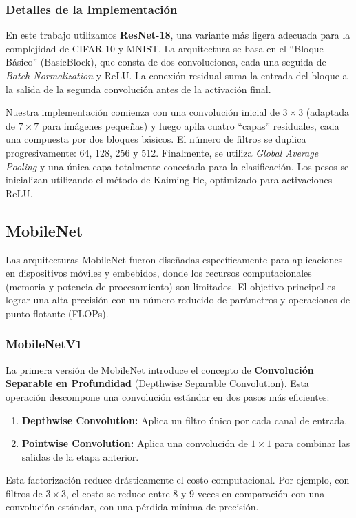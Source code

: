 \documentclass{pas}
\begin{document}
\subsubsection{Detalles de la Implementación}

En este trabajo utilizamos \textbf{ResNet-18}, una variante más ligera adecuada para la complejidad de CIFAR-10 y MNIST. La arquitectura se basa en el ``Bloque Básico'' (BasicBlock), que consta de dos convoluciones, cada una seguida de \textit{Batch Normalization} y ReLU. La conexión residual suma la entrada del bloque a la salida de la segunda convolución antes de la activación final.

Nuestra implementación comienza con una convolución inicial de $3 \times 3$ (adaptada de $7 \times 7$ para imágenes pequeñas) y luego apila cuatro ``capas'' residuales, cada una compuesta por dos bloques básicos. El número de filtros se duplica progresivamente: 64, 128, 256 y 512. Finalmente, se utiliza \textit{Global Average Pooling} y una única capa totalmente conectada para la clasificación. Los pesos se inicializan utilizando el método de Kaiming He, optimizado para activaciones ReLU.

\subsection{MobileNet}

Las arquitecturas MobileNet fueron diseñadas específicamente para aplicaciones en dispositivos móviles y embebidos, donde los recursos computacionales (memoria y potencia de procesamiento) son limitados. El objetivo principal es lograr una alta precisión con un número reducido de parámetros y operaciones de punto flotante (FLOPs).

\subsubsection{MobileNetV1}

La primera versión de MobileNet \cite{howard2017mobilenets} introduce el concepto de \textbf{Convolución Separable en Profundidad} (Depthwise Separable Convolution). Esta operación descompone una convolución estándar en dos pasos más eficientes:
\begin{enumerate}
    \item \textbf{Depthwise Convolution:} Aplica un filtro único por cada canal de entrada.
    \item \textbf{Pointwise Convolution:} Aplica una convolución de $1 \times 1$ para combinar las salidas de la etapa anterior.
\end{enumerate}
Esta factorización reduce drásticamente el costo computacional. Por ejemplo, con filtros de $3 \times 3$, el costo se reduce entre 8 y 9 veces en comparación con una convolución estándar, con una pérdida mínima de precisión.
\end{document}
